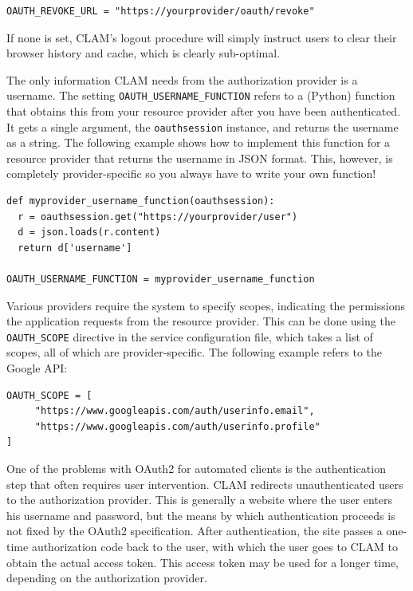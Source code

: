 \documentclass[a4paper,12pt,twoside,openright]{report}
\begin{document}
{ \small
\begin{verbatim}
OAUTH_REVOKE_URL = "https://yourprovider/oauth/revoke"
\end{verbatim}
}

If none is set, CLAM's logout procedure will simply instruct users to clear
their browser history and cache, which is clearly sub-optimal.

The only information CLAM needs from the authorization provider is a username.
The setting \texttt{OAUTH\_USERNAME\_FUNCTION} refers to a (Python) function
that obtains this from your resource provider after you have been
authenticated. It gets a single argument, the \texttt{oauthsession}
instance, and returns the username as a string.  The following example shows
how to implement this function for a resource provider that returns the
username in JSON format. This, however, is completely provider-specific so
you always have to write your own function! 

{ \small
\begin{verbatim}
def myprovider_username_function(oauthsession):
  r = oauthsession.get("https://yourprovider/user")
  d = json.loads(r.content)
  return d['username']

OAUTH_USERNAME_FUNCTION = myprovider_username_function
\end{verbatim}
}

Various providers require the system to specify scopes, indicating the
permissions the application requests from the resource provider. This can be
done using the \texttt{OAUTH\_SCOPE} directive in the service configuration
file, which takes a list of scopes, all of which are provider-specific. The
following example refers to the Google API:

{ \small
\begin{verbatim}
OAUTH_SCOPE = [
     "https://www.googleapis.com/auth/userinfo.email",
     "https://www.googleapis.com/auth/userinfo.profile"
]
\end{verbatim}
}

One of the problems with OAuth2 for automated clients is the authentication
step that often requires user intervention. CLAM redirects unauthenticated
users to the authorization provider. This is generally a website where the user
enters his username and password, but the means by which authentication
proceeds is not fixed by the OAuth2 specification. After authentication, the
site passes a one-time authorization code back to the user, with which the user
goes to CLAM to obtain the actual access token. This access token may be used
for a longer time, depending on the authorization provider.
\end{document}

